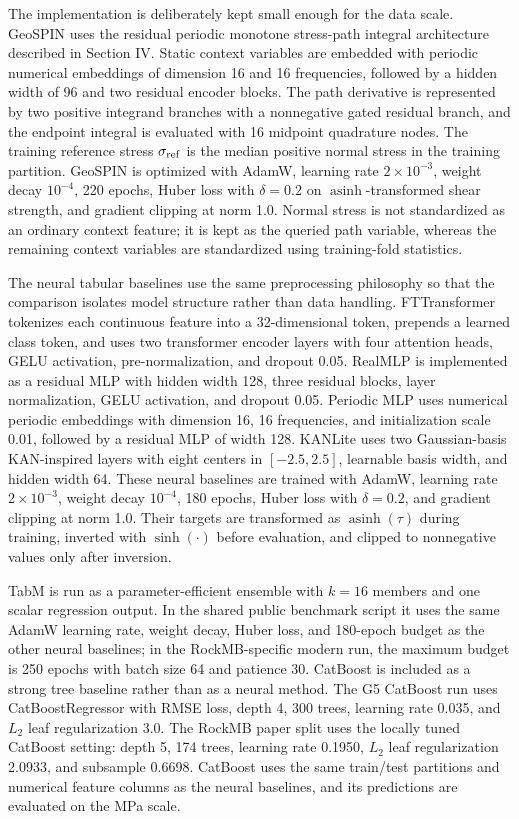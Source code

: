 \documentclass[journal]{IEEEtran}
\begin{document}
The implementation is deliberately kept small enough for the data scale. GeoSPIN uses the residual periodic monotone stress-path integral architecture described in Section IV. Static context variables are embedded with periodic numerical embeddings of dimension 16 and 16 frequencies, followed by a hidden width of 96 and two residual encoder blocks. The path derivative is represented by two positive integrand branches with a nonnegative gated residual branch, and the endpoint integral is evaluated with 16 midpoint quadrature nodes. The training reference stress $\sigma_{\rm ref}$ is the median positive normal stress in the training partition. GeoSPIN is optimized with AdamW, learning rate $2\times10^{-3}$, weight decay $10^{-4}$, 220 epochs, Huber loss with $\delta=0.2$ on $\operatorname{asinh}$-transformed shear strength, and gradient clipping at norm 1.0. Normal stress is not standardized as an ordinary context feature; it is kept as the queried path variable, whereas the remaining context variables are standardized using training-fold statistics.

The neural tabular baselines use the same preprocessing philosophy so that the comparison isolates model structure rather than data handling. FTTransformer tokenizes each continuous feature into a 32-dimensional token, prepends a learned class token, and uses two transformer encoder layers with four attention heads, GELU activation, pre-normalization, and dropout 0.05. RealMLP is implemented as a residual MLP with hidden width 128, three residual blocks, layer normalization, GELU activation, and dropout 0.05. Periodic MLP uses numerical periodic embeddings with dimension 16, 16 frequencies, and initialization scale 0.01, followed by a residual MLP of width 128. KANLite uses two Gaussian-basis KAN-inspired layers with eight centers in $[-2.5,2.5]$, learnable basis width, and hidden width 64. These neural baselines are trained with AdamW, learning rate $2\times10^{-3}$, weight decay $10^{-4}$, 180 epochs, Huber loss with $\delta=0.2$, and gradient clipping at norm 1.0. Their targets are transformed as $\operatorname{asinh}(\tau)$ during training, inverted with $\sinh(\cdot)$ before evaluation, and clipped to nonnegative values only after inversion.

TabM is run as a parameter-efficient ensemble with $k=16$ members and one scalar regression output. In the shared public benchmark script it uses the same AdamW learning rate, weight decay, Huber loss, and 180-epoch budget as the other neural baselines; in the RockMB-specific modern run, the maximum budget is 250 epochs with batch size 64 and patience 30. CatBoost is included as a strong tree baseline rather than as a neural method. The G5 CatBoost run uses CatBoostRegressor with RMSE loss, depth 4, 300 trees, learning rate 0.035, and $L_2$ leaf regularization 3.0. The RockMB paper split uses the locally tuned CatBoost setting: depth 5, 174 trees, learning rate 0.1950, $L_2$ leaf regularization 2.0933, and subsample 0.6698. CatBoost uses the same train/test partitions and numerical feature columns as the neural baselines, and its predictions are evaluated on the MPa scale.
\end{document}
